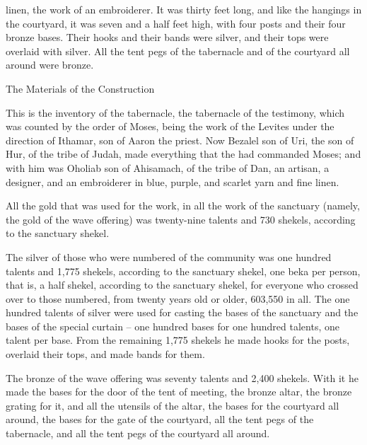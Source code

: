 {linen,
the work
of an embroiderer.
It was thirty feet
long,
and like
the hangings
in the courtyard,
it was seven and a half feet
high,
with four
posts
and their four
bronze
bases.
Their hooks
and their bands
were silver,
and their tops
were overlaid
with silver.
All
the tent pegs
of the tabernacle
and of the courtyard
all around
were bronze.
\par }{\SH The Materials of the Construction
\par }{\PP {}This
is the inventory
of the tabernacle,
the tabernacle
of the testimony,
which
was counted
by
the order
of Moses,
being the work
of the Levites
under the direction
of Ithamar,
son
of Aaron
the priest.
Now Bezalel
son
of Uri,
the son
of Hur,
of the tribe
of Judah,
made
everything
that
the {}
had commanded
Moses;
and with
him was Oholiab
son
of Ahisamach,
of the tribe
of Dan,
an artisan,
a designer,
and an embroiderer
in blue,
purple,
and scarlet
yarn
and fine linen.
\par }{\PP {}All
the gold
that was used
for the work,
in all
the work
of the sanctuary
(namely,
the gold
of the wave offering) was twenty-nine
talents
and 730
shekels,
according to the sanctuary
shekel.
\par }{\PP {}The silver
of those who were numbered
of the community
was one hundred
talents
and 1,775
shekels,
according to the sanctuary
shekel,
one beka
per person,
that is, a half
shekel,
according to the sanctuary
shekel,
for everyone
who crossed
over
to those numbered,
from twenty
years
old or older,
603,550 in all.
The one hundred
talents
of silver
were used for casting
the bases
of the sanctuary
and the bases
of the special curtain
– one hundred
bases
for one hundred
talents,
one talent
per base.
From the remaining 1,775 shekels he
made
hooks
for the posts,
overlaid
their tops,
and made bands for them.
\par }{\PP {}The bronze
of the wave offering
was seventy
talents
and 2,400
shekels.
With it he made
the
bases
for the door
of the tent
of meeting,
the
bronze
altar,
the bronze
grating
for it, and all
the utensils
of the altar,
the
bases
for the courtyard
all around,
the
bases
for the gate
of the courtyard,
all
the tent pegs
of the tabernacle,
and all
the tent pegs
of the courtyard
all around.

}
